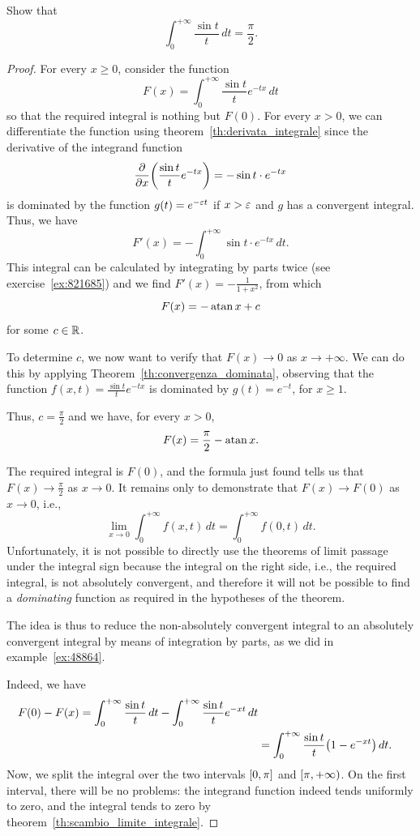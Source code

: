 \begin{exercise}
  \label{ex:integrale_sin_integrale}%
Show that 
  \[
    \int_0^{+\infty} \frac{\sin t}{t}\, dt = \frac \pi 2.
  \] 
\end{exercise}
\begin{proof}
For every $x \ge 0$, consider the function 
\[
  F(x) = \int_0^{+\infty} \frac{\sin t}{t}e^{-tx}\, dt
\]
so that the required integral is nothing but $F(0)$.
For every $x>0$,
we can differentiate the function using theorem~\ref{th:derivata_integrale}
since the derivative of the integrand function 
\[
  \frac{\partial}{\partial x}{\left( \frac{\sin t}{t}e^{-tx} \right)} 
  = -\sin t \cdot e^{-tx}
\]
is dominated by the function $g(t) = e^{- \varepsilon t}$ if $x>\varepsilon$ and 
$g$ has a convergent integral.
Thus, we have 
\[
  F'(x) = - \int_0^{+\infty} \sin t \cdot e^{-tx}\, dt. 
\]
This integral can be calculated by integrating by parts twice 
(see exercise~\ref{ex:821685}) and we find 
$F'(x) = -\frac{1}{1+x^2}$, from which
\[
  F(x) = -\operatorname{atan} x + c
\]
for some $c \in {\mathbb R}$.

To determine $c$, 
we now want to verify that $F(x) \to 0$ as $x\to +\infty$.
We can do this by applying Theorem~\ref{th:convergenza_dominata}, observing that
the function $f(x,t) = \frac{\sin t}{t}e^{-tx}$ is dominated by $g(t) = e^{-t}$,
for $x\ge 1$.

Thus, $c=\frac{\pi} 2$ and we have, for every $x>0$,
\[
  F(x) = \frac{\pi} 2 - \operatorname{atan} x.
\]

The required integral is $F(0)$, and the formula just found tells us that
$F(x)\to \frac \pi 2$ as $x\to 0$.
It remains only to demonstrate that $F(x)\to F(0)$ as 
$x\to 0$, i.e.,
\[
  \lim_{x\to 0} \int_0^{+\infty} f(x,t) \, dt
  = \int_0^{+\infty} f(0,t) \, dt.
\]
Unfortunately, it is not possible to directly use the theorems 
of limit passage under the integral sign because 
the integral on the right side, i.e., the required integral, is not 
absolutely convergent, and therefore it will not be possible to find 
a \emph{dominating} function as required in the hypotheses of the theorem.

The idea is thus to reduce the non-absolutely convergent integral 
to an absolutely convergent integral by means of integration by parts, 
as we did in example~\ref{ex:48864}.

Indeed, we have 
\begin{align*}
F(0) - F(x) 
  = \int_0^{+\infty} \frac{\sin t}{t}\, dt  - \int_0^{+\infty} \frac{\sin
 t}{t}e^{-xt}\, dt \\
 & = \int_0^{+\infty} \frac{\sin t}{t}{\left( 1-e^{-xt} \right)}\, dt.
\end{align*}
Now, we split the integral over the two intervals $\left[0,\pi\right]$ 
and $\left[\pi,+\infty\right)$.
On the first interval, there will be no problems: the integrand function 
indeed tends uniformly to zero, and the integral tends to zero 
by theorem~\ref{th:scambio_limite_integrale}.


\end{proof}
